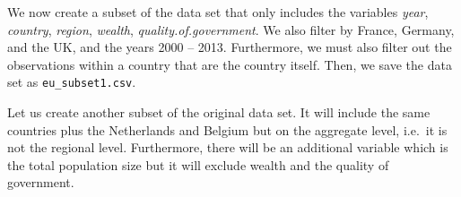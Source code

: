 \documentclass[]{article}
\newenvironment{Shaded}{\begin{snugshade}}{\end{snugshade}}
\newcommand{\CommentTok}[1]{\textcolor[rgb]{0.56,0.35,0.01}{\textit{#1}}}
\newcommand{\DataTypeTok}[1]{\textcolor[rgb]{0.13,0.29,0.53}{#1}}
\newcommand{\DecValTok}[1]{\textcolor[rgb]{0.00,0.00,0.81}{#1}}
\newcommand{\KeywordTok}[1]{\textcolor[rgb]{0.13,0.29,0.53}{\textbf{#1}}}
\newcommand{\NormalTok}[1]{#1}
\newcommand{\OperatorTok}[1]{\textcolor[rgb]{0.81,0.36,0.00}{\textbf{#1}}}
\newcommand{\OtherTok}[1]{\textcolor[rgb]{0.56,0.35,0.01}{#1}}
\newcommand{\StringTok}[1]{\textcolor[rgb]{0.31,0.60,0.02}{#1}}
\begin{document}
We now create a subset of the data set that only includes the variables \emph{year}, \emph{country}, \emph{region}, \emph{wealth}, \emph{quality.of.government}. We also filter by France, Germany, and the UK, and the years 2000 -- 2013. Furthermore, we must also filter out the observations within a country that are the country itself. Then, we save the data set as \texttt{eu\_subset1.csv}.

\begin{Shaded}
\end{Shaded}

Let us create another subset of the original data set. It will include the same countries plus the Netherlands and Belgium but on the aggregate level, i.e.~it is not the regional level. Furthermore, there will be an additional variable which is the total population size but it will exclude wealth and the quality of government.
\end{document}
